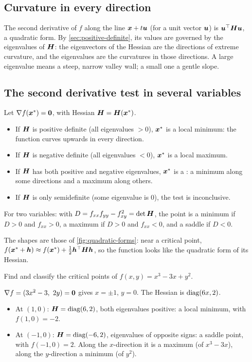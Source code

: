 \subsection{Curvature in every direction}

The second derivative of $f$ along the line $\bm{x} + t\bm{u}$ (for a unit vector
$\bm{u}$) is $\bm{u}^\top\bm{H}\bm{u}$, a quadratic form. By \cref{sec:positive-definite},
its values are governed by the eigenvalues of $\bm{H}$: the eigenvectors of the
Hessian are the directions of extreme curvature, and the eigenvalues are the
curvatures in those directions. A large eigenvalue means a steep, narrow
valley wall; a small one a gentle slope.

\subsection{The second derivative test in several variables}

\begin{theorem}\label{thm:second-derivative-test-multi}
Let $\nabla f(\bm{x}^*) = \bm{0}$, with Hessian $\bm{H} = \bm{H}(\bm{x}^*)$.
\begin{itemize}
  \item If $\bm{H}$ is positive definite (all eigenvalues $> 0$), $\bm{x}^*$ is a
    local minimum: the function curves upwards in every direction.
  \item If $\bm{H}$ is negative definite (all eigenvalues $< 0$), $\bm{x}^*$ is a
    local maximum.
  \item If $\bm{H}$ has both positive and negative eigenvalues, $\bm{x}^*$ is a
    : a minimum along some directions and a maximum along
    others.
  \item If $\bm{H}$ is only semidefinite (some eigenvalue is $0$), the test is
    inconclusive.
\end{itemize}
For two variables: with $D = f_{xx}f_{yy} - f_{xy}^2 = \det\bm{H}$, the point is a
minimum if $D > 0$ and $f_{xx} > 0$, a maximum if $D > 0$ and $f_{xx} < 0$, and a
saddle if $D < 0$.
\end{theorem}

The shapes are those of \cref{fig:quadratic-forms}: near a critical point,
$f(\bm{x}^* + \bm{h}) \approx f(\bm{x}^*) + \frac12\bm{h}^\top\bm{H}\bm{h}$, so the function looks
like the quadratic form of its Hessian.

\begin{example}\label{ex:classify-2d}
Find and classify the critical points of $f(x, y) = x^3 - 3x + y^2$.

\sol $\nabla f = (3x^2 - 3,\ 2y) = \bm{0}$ gives $x = \pm1$, $y = 0$. The
Hessian is $\operatorname{diag}(6x, 2)$.
\begin{itemize}
  \item At $(1, 0)$: $\bm{H} = \operatorname{diag}(6, 2)$, both eigenvalues positive: a local
    minimum, with $f(1, 0) = -2$.
  \item At $(-1, 0)$: $\bm{H} = \operatorname{diag}(-6, 2)$, eigenvalues of opposite signs: a
    saddle point, with $f(-1,0) = 2$. Along the $x$-direction it is a maximum
    (of $x^3 - 3x$), along the $y$-direction a minimum (of $y^2$).
\end{itemize}
\end{example}

